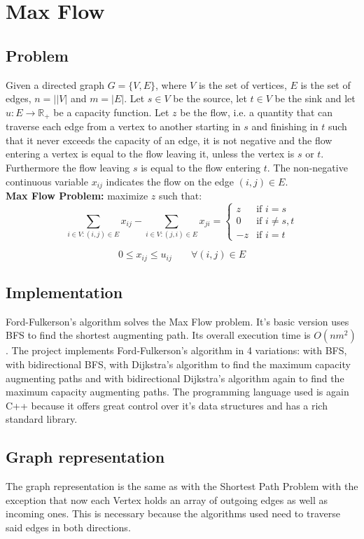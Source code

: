 \section{Max Flow}
\subsection{Problem}
Given a directed graph $G=\{V,E\}$, where $V$ is the set of vertices, $E$ is the set of edges, $n=||V|$ and $m=|E|$.
Let $s \in V$ be the source, let $t \in V$ be the sink and let $u: E \to \mathbb{R}_+$ be a capacity function.
Let $z$ be the flow, i.e. a quantity that can traverse each edge from a vertex to another starting in $s$ and finishing in $t$ such that it never exceeds the capacity of an edge,
it is not negative and the flow entering a vertex is equal to the flow leaving it, unless the vertex is $s$ or $t$. Furthermore the flow leaving $s$ is equal to the flow entering $t$.
The non-negative continuous variable $x_{ij}$ indicates the flow on the edge $(i,j)\in E$.
\vspace{1em}\\
\textbf{Max Flow Problem:} maximize $z$ such that:
\[
\sum_{i\in V:(i,j)\in E} x_{ij} - \sum_{i\in V:(j,i)\in E} x_{ji} =
\begin{cases}
    z & \text{if } i=s\\
    0 & \text{if } i\neq s,t\\
    -z & \text{if } i=t
\end{cases}
\]

\[0 \leq x_{ij} \leq u_{ij} \;\;\;\;\;\;\; \forall (i,j)\in E \]

\subsection{Implementation}
Ford-Fulkerson's algorithm solves the Max Flow problem. It's basic version uses BFS to find the shortest augmenting path. Its overall execution time is $O(nm^2)$.
The project implements Ford-Fulkerson's algorithm in 4 variations: with BFS, with bidirectional BFS, with Dijkstra's algorithm to find the maximum capacity augmenting paths
and with bidirectional Dijkstra's algorithm again to find the maximum capacity augmenting paths.
The programming language used is again C++ because it offers great control over it's data structures and has a rich standard library.

\subsection{Graph representation}
The graph representation is the same as with the Shortest Path Problem with the exception that now each Vertex holds
an array of outgoing edges as well as incoming ones. This is necessary because the algorithms used need to traverse said edges in both directions.

